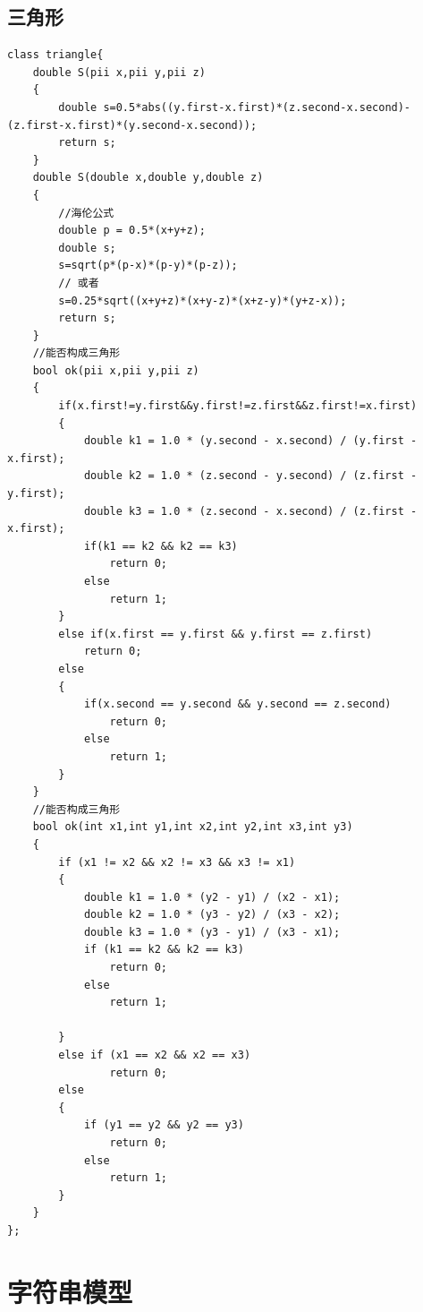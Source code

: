 \documentclass[12pt, a4paper, oneside]{ctexart}
\begin{document}
\subsection{三角形} 
\begin{lstlisting}
class triangle{
	double S(pii x,pii y,pii z)
	{
		double s=0.5*abs((y.first-x.first)*(z.second-x.second)-(z.first-x.first)*(y.second-x.second));
		return s;
	}
	double S(double x,double y,double z)
	{
		//海伦公式
		double p = 0.5*(x+y+z);
		double s;
		s=sqrt(p*(p-x)*(p-y)*(p-z));
		// 或者
		s=0.25*sqrt((x+y+z)*(x+y-z)*(x+z-y)*(y+z-x));
		return s;
	}
	//能否构成三角形
	bool ok(pii x,pii y,pii z)
	{
		if(x.first!=y.first&&y.first!=z.first&&z.first!=x.first)
		{
			double k1 = 1.0 * (y.second - x.second) / (y.first - x.first);
			double k2 = 1.0 * (z.second - y.second) / (z.first - y.first);
			double k3 = 1.0 * (z.second - x.second) / (z.first - x.first);
			if(k1 == k2 && k2 == k3)
				return 0;
			else 
				return 1;
		}
		else if(x.first == y.first && y.first == z.first)
			return 0;
		else
		{
			if(x.second == y.second && y.second == z.second)
				return 0;
			else
				return 1;
		}
	}
	//能否构成三角形
	bool ok(int x1,int y1,int x2,int y2,int x3,int y3)
	{
		if (x1 != x2 && x2 != x3 && x3 != x1)
		{
			double k1 = 1.0 * (y2 - y1) / (x2 - x1);
			double k2 = 1.0 * (y3 - y2) / (x3 - x2);
			double k3 = 1.0 * (y3 - y1) / (x3 - x1);
			if (k1 == k2 && k2 == k3)
				return 0;
			else
				return 1;
			
		}
		else if (x1 == x2 && x2 == x3)
				return 0;
		else
		{
			if (y1 == y2 && y2 == y3)
				return 0;
			else
				return 1;
		}
	}
};
\end{lstlisting}





\newpage
\section{字符串模型} 
\end{document}
